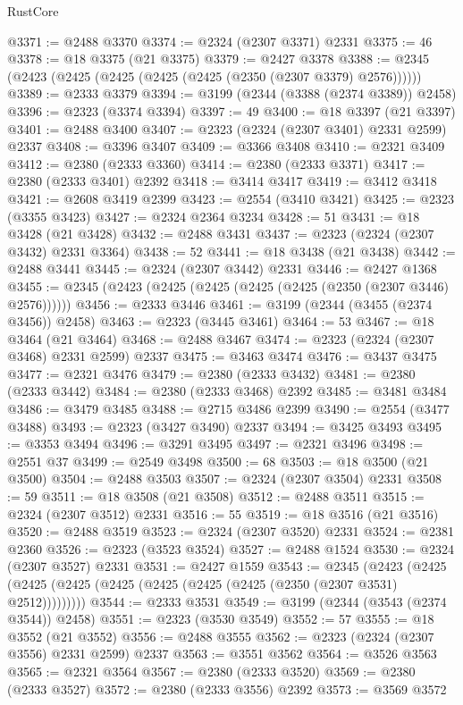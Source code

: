 \begin{lexlean}{RustCore}
\begin{coremodule}
@3371 := @2488 @3370
@3374 := @2324 (@2307 @3371) @2331
@3375 := 46
@3378 := @18 @3375 (@21 @3375)
@3379 := @2427 @3378
@3388 := @2345 (@2423 (@2425 (@2425 (@2425 (@2425 (@2350 (@2307 @3379) @2576))))))
@3389 := @2333 @3379
@3394 := @3199 (@2344 (@3388 (@2374 @3389)) @2458)
@3396 := @2323 (@3374 @3394)
@3397 := 49
@3400 := @18 @3397 (@21 @3397)
@3401 := @2488 @3400
@3407 := @2323 (@2324 (@2307 @3401) @2331 @2599) @2337
@3408 := @3396 @3407
@3409 := @3366 @3408
@3410 := @2321 @3409
@3412 := @2380 (@2333 @3360)
@3414 := @2380 (@2333 @3371)
@3417 := @2380 (@2333 @3401) @2392
@3418 := @3414 @3417
@3419 := @3412 @3418
@3421 := @2608 @3419 @2399
@3423 := @2554 (@3410 @3421)
@3425 := @2323 (@3355 @3423)
@3427 := @2324 @2364 @3234
@3428 := 51
@3431 := @18 @3428 (@21 @3428)
@3432 := @2488 @3431
@3437 := @2323 (@2324 (@2307 @3432) @2331 @3364)
@3438 := 52
@3441 := @18 @3438 (@21 @3438)
@3442 := @2488 @3441
@3445 := @2324 (@2307 @3442) @2331
@3446 := @2427 @1368
@3455 := @2345 (@2423 (@2425 (@2425 (@2425 (@2425 (@2350 (@2307 @3446) @2576))))))
@3456 := @2333 @3446
@3461 := @3199 (@2344 (@3455 (@2374 @3456)) @2458)
@3463 := @2323 (@3445 @3461)
@3464 := 53
@3467 := @18 @3464 (@21 @3464)
@3468 := @2488 @3467
@3474 := @2323 (@2324 (@2307 @3468) @2331 @2599) @2337
@3475 := @3463 @3474
@3476 := @3437 @3475
@3477 := @2321 @3476
@3479 := @2380 (@2333 @3432)
@3481 := @2380 (@2333 @3442)
@3484 := @2380 (@2333 @3468) @2392
@3485 := @3481 @3484
@3486 := @3479 @3485
@3488 := @2715 @3486 @2399
@3490 := @2554 (@3477 @3488)
@3493 := @2323 (@3427 @3490) @2337
@3494 := @3425 @3493
@3495 := @3353 @3494
@3496 := @3291 @3495
@3497 := @2321 @3496
@3498 := @2551 @37
@3499 := @2549 @3498
@3500 := 68
@3503 := @18 @3500 (@21 @3500)
@3504 := @2488 @3503
@3507 := @2324 (@2307 @3504) @2331
@3508 := 59
@3511 := @18 @3508 (@21 @3508)
@3512 := @2488 @3511
@3515 := @2324 (@2307 @3512) @2331
@3516 := 55
@3519 := @18 @3516 (@21 @3516)
@3520 := @2488 @3519
@3523 := @2324 (@2307 @3520) @2331
@3524 := @2381 @2360
@3526 := @2323 (@3523 @3524)
@3527 := @2488 @1524
@3530 := @2324 (@2307 @3527) @2331
@3531 := @2427 @1559
@3543 := @2345
    (@2423 (@2425 (@2425 (@2425 (@2425 (@2425 (@2425 (@2425 (@2350 (@2307 @3531) @2512)))))))))
@3544 := @2333 @3531
@3549 := @3199 (@2344 (@3543 (@2374 @3544)) @2458)
@3551 := @2323 (@3530 @3549)
@3552 := 57
@3555 := @18 @3552 (@21 @3552)
@3556 := @2488 @3555
@3562 := @2323 (@2324 (@2307 @3556) @2331 @2599) @2337
@3563 := @3551 @3562
@3564 := @3526 @3563
@3565 := @2321 @3564
@3567 := @2380 (@2333 @3520)
@3569 := @2380 (@2333 @3527)
@3572 := @2380 (@2333 @3556) @2392
@3573 := @3569 @3572

\end{coremodule}
\end{lexlean}
